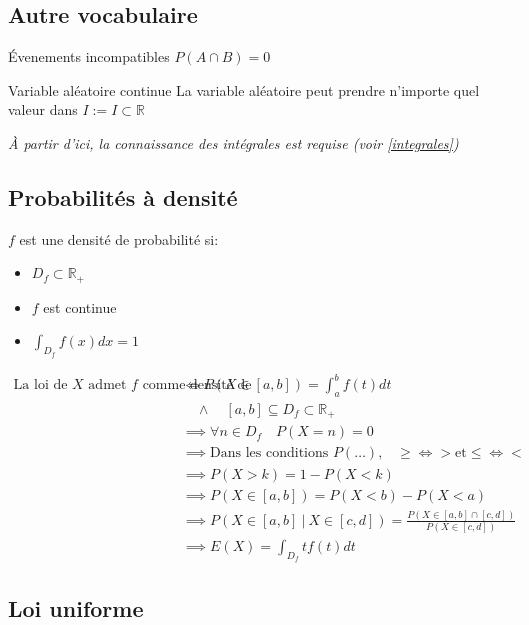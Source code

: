 \documentclass{article}
\newcommand{\R}{\mathds{R}}
\newenvironment{descriptiona}{\begin{description}[leftmargin=!,labelwidth=\widthof{\bfseries The longest label}]}{\end{description}}
\begin{document}
\subsection{Autre vocabulaire}
\begin{descriptiona}
\item[Évenements incompatibles]
$P(A \cap B) = 0$ 
\item[Variable aléatoire continue] La variable aléatoire peut prendre n'importe quel valeur dans $I := I \subset \R$
\end{descriptiona}

\textit{À partir d'ici, la connaissance des intégrales est requise (voir \ref{integrales})}
\subsection{Probabilités à densité}

$f$ est une densité de probabilité si:

\begin{itemize}
    \item $D_f \subset \R_+$
    \item $f$ est continue
    \item ${\displaystyle \int_{D_f} f(x)dx = 1}$
\end{itemize}

\begin{equation*}
    \begin{split}
        \text{La loi de $X$ admet $f$ comme densité de probabilité} &\iff P(X \in [a, b]) = \int_a^b f(t)dt \\
        &\quad \land \quad [a, b] \subseteq D_f \subset \R_+ \\
        &\implies \forall n \in D_f \quad P(X = n) = 0 \\
		&\implies \text{Dans les conditions $P(\ldots)$,}\quad \geq \iff > \text{et} \leq \iff <\\
        &\implies P(X > k) = 1-P(X < k) \\
        &\implies P(X \in [a, b]) = P(X < b) - P(X < a) \\
        &\implies P(X \in [a, b] \:|\: X \in [c, d]) = \frac{P(X \in [a, b] \cap [c, d])}{P(X \in [c, d])} \\
        &\implies E(X) = \int_{D_f} tf(t)dt
    \end{split}
\end{equation*}

\subsection{Loi uniforme}
\end{document}
